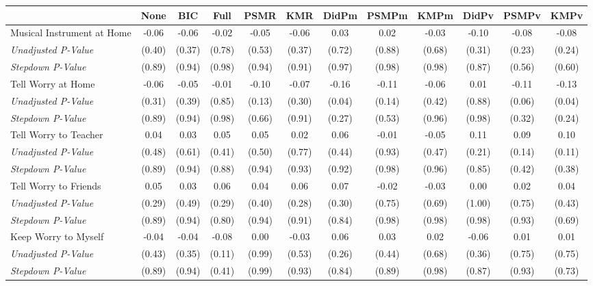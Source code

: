 \begin{tabular}{l c c c c c c c c c c c}
\toprule
 & None & BIC & Full & PSMR & KMR & DidPm & PSMPm & KMPm & DidPv & PSMPv & KMPv \\
\midrule
Musical Instrument at Home & -0.06 & -0.06 & -0.02 & -0.05 & -0.06 & 0.03 & 0.02 & -0.03 & -0.10 & -0.08 & -0.08 \\
\quad \textit{Unadjusted P-Value} & (0.40) & (0.37) & (0.78) & (0.53) & (0.37) & (0.72) & (0.88) & (0.68) & (0.31) & (0.23) & (0.24) \\
\quad \textit{Stepdown P-Value} & (0.89) & (0.94) & (0.98) & (0.94) & (0.91) & (0.97) & (0.98) & (0.98) & (0.87) & (0.56) & (0.60) \\
Tell Worry at Home & -0.06 & -0.05 & -0.01 & -0.10 & -0.07 & -0.16 & -0.11 & -0.06 & 0.01 & -0.11 & -0.13 \\
\quad \textit{Unadjusted P-Value} & (0.31) & (0.39) & (0.85) & (0.13) & (0.30) & (0.04) & (0.14) & (0.42) & (0.88) & (0.06) & (0.04) \\
\quad \textit{Stepdown P-Value} & (0.89) & (0.94) & (0.98) & (0.66) & (0.91) & (0.27) & (0.53) & (0.96) & (0.98) & (0.32) & (0.24) \\
Tell Worry to Teacher & 0.04 & 0.03 & 0.05 & 0.05 & 0.02 & 0.06 & -0.01 & -0.05 & 0.11 & 0.09 & 0.10 \\
\quad \textit{Unadjusted P-Value} & (0.48) & (0.61) & (0.41) & (0.50) & (0.77) & (0.44) & (0.93) & (0.47) & (0.21) & (0.14) & (0.11) \\
\quad \textit{Stepdown P-Value} & (0.89) & (0.94) & (0.88) & (0.94) & (0.93) & (0.92) & (0.98) & (0.96) & (0.85) & (0.42) & (0.38) \\
Tell Worry to Friends & 0.05 & 0.03 & 0.06 & 0.04 & 0.06 & 0.07 & -0.02 & -0.03 & 0.00 & 0.02 & 0.04 \\
\quad \textit{Unadjusted P-Value} & (0.29) & (0.49) & (0.29) & (0.40) & (0.28) & (0.30) & (0.75) & (0.69) & (1.00) & (0.75) & (0.43) \\
\quad \textit{Stepdown P-Value} & (0.89) & (0.94) & (0.80) & (0.94) & (0.91) & (0.84) & (0.98) & (0.98) & (0.98) & (0.93) & (0.69) \\
Keep Worry to Myself & -0.04 & -0.04 & -0.08 & 0.00 & -0.03 & 0.06 & 0.03 & 0.02 & -0.06 & 0.01 & 0.01 \\
\quad \textit{Unadjusted P-Value} & (0.43) & (0.35) & (0.11) & (0.99) & (0.53) & (0.26) & (0.44) & (0.68) & (0.36) & (0.75) & (0.75) \\
\quad \textit{Stepdown P-Value} & (0.89) & (0.94) & (0.41) & (0.99) & (0.93) & (0.84) & (0.89) & (0.98) & (0.87) & (0.93) & (0.73) \\

\end{tabular}
